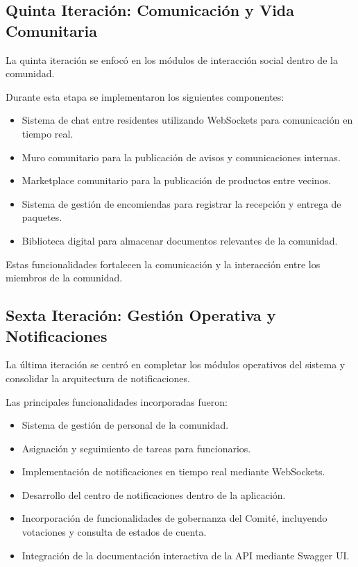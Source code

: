 \subsection{Quinta Iteración: Comunicación y Vida Comunitaria}

La quinta iteración se enfocó en los módulos de interacción social dentro de la comunidad.

Durante esta etapa se implementaron los siguientes componentes:

\begin{itemize}

\item Sistema de chat entre residentes utilizando WebSockets para comunicación en tiempo real.

\item Muro comunitario para la publicación de avisos y comunicaciones internas.

\item Marketplace comunitario para la publicación de productos entre vecinos.

\item Sistema de gestión de encomiendas para registrar la recepción y entrega de paquetes.

\item Biblioteca digital para almacenar documentos relevantes de la comunidad.

\end{itemize}

Estas funcionalidades fortalecen la comunicación y la interacción entre los miembros de la comunidad.

\subsection{Sexta Iteración: Gestión Operativa y Notificaciones}

La última iteración se centró en completar los módulos operativos del sistema y consolidar la arquitectura de notificaciones.

Las principales funcionalidades incorporadas fueron:

\begin{itemize}

\item Sistema de gestión de personal de la comunidad.

\item Asignación y seguimiento de tareas para funcionarios.

\item Implementación de notificaciones en tiempo real mediante WebSockets.

\item Desarrollo del centro de notificaciones dentro de la aplicación.

\item Incorporación de funcionalidades de gobernanza del Comité, incluyendo votaciones y consulta de estados de cuenta.

\item Integración de la documentación interactiva de la API mediante Swagger UI.

\end{itemize}

